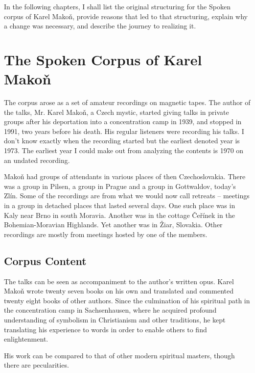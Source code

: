 \documentclass[runningheads]{llncs}
\begin{document}
In the following chapters, I shall list the original structuring for the Spoken
corpus of Karel Makoň, provide reasons that led to that structuring, explain why
a change was necessary, and describe the journey to realizing it.

\section{The Spoken Corpus of Karel Makoň}

The corpus arose as a set of amateur recordings on magnetic tapes. The author of
the talks, Mr. Karel Makoň\cite{hajek2007cesky}, a Czech mystic, started giving talks in private
groups after his deportation into a concentration camp in 1939, and stopped in
1991, two years before his death. His regular listeners were recording his
talks. I don't know exactly when the recording started but the earliest denoted
year is 1973. The earliest year I could make out from analyzing the contents is
1970 on an undated recording.

Makoň had groups of attendants in various places of then Czechoslovakia. There
was a group in Pilsen, a group in Prague and a group in Gottwaldov, today's
Zlín. Some of the recordings are from what we would now call retreats -- meetings
in a group in detached places that lasted several days. One such place was in
Kaly near Brno in south Moravia. Another was in the cottage Čeřínek in the
Bohemian-Moravian Highlands. Yet another was in Žiar, Slovakia. Other recordings are mostly from meetings hosted by one of
the members.

\subsection{Corpus Content}

The talks can be seen as accompaniment to the author's written opus. Karel Makoň
wrote twenty seven books on his own and translated and commented twenty eight
books of other authors. Since the culmination of his spiritual path in the
concentration camp in Sachsenhausen, where he acquired profound understanding of
symbolism in Christianism and other traditions, he kept translating his
experience to words in order to enable others to find enlightenment.

His work can be compared to that of other modern spiritual masters, though there
are pecularities.
\end{document}

